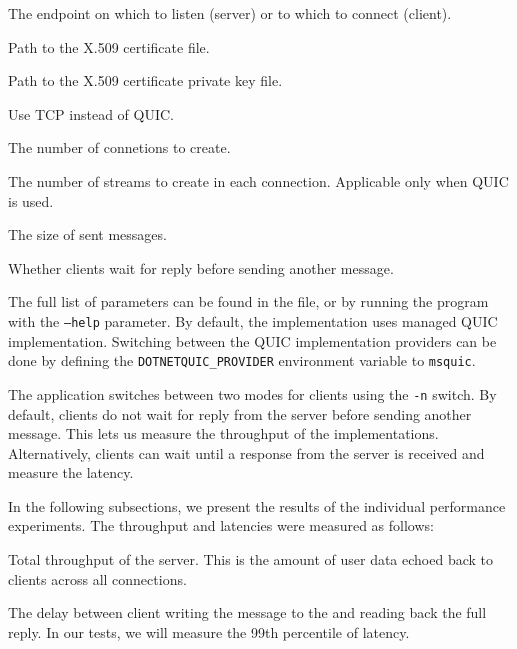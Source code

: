 \begin{description}

     The endpoint on which to listen (server) or to which to connect (client).

     Path to the X.509 certificate file.

     Path to the X.509 certificate private key file.

     Use TCP instead of QUIC.

     The number of connetions to create.

     The number of streams to create in each connection. Applicable only when QUIC is used.

     The size of sent messages.

     Whether clients wait for reply before sending another message.

\end{description}

The full list of parameters can be found in the  file, or by running the
program with the \texttt{--help} parameter. By default, the implementation uses managed QUIC
implementation. Switching between the QUIC implementation providers can be done by defining the
\texttt{DOTNETQUIC_PROVIDER} environment variable to \texttt{msquic}.

The application switches between two modes for clients using the \texttt{-n} switch. By default,
clients do not wait for reply from the server before sending another message. This lets us measure
the throughput of the implementations. Alternatively, clients can wait until a response from the
server is received and measure the latency.

In the following subsections, we present the results of the individual performance experiments. The
throughput and latencies were measured as follows:

\begin{itemize}

   Total throughput of the server. This is the amount of user data echoed back to clients across all connections.

   The delay between client writing the message to the \Stream{} and reading back the full reply. In our tests, we will measure the 99th percentile of latency.

\end{itemize}

